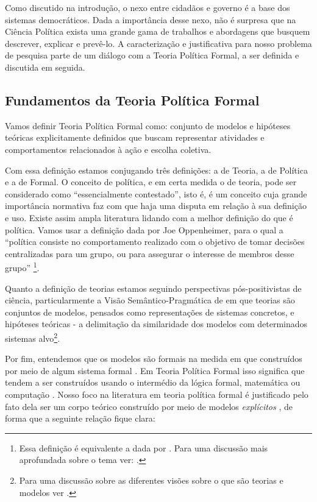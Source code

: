 Como discutido na introdução, o nexo entre cidadãos e governo é a base dos
sistemas democráticos. Dada a importância desse nexo, não é surpresa que na
Ciência Política exista uma grande gama de trabalhos e abordagens que busquem
descrever, explicar e prevê-lo. A caracterização e
justificativa para nosso problema de pesquisa parte de um diálogo com a Teoria
Política Formal, a ser definida e discutida em seguida.

\subsection{Fundamentos da Teoria Política Formal}

Vamos definir Teoria Política Formal como: conjunto de modelos e hipóteses
teóricas explicitamente definidos que buscam representar atividades e
comportamentos relacionados à ação e escolha coletiva.

Com essa definição estamos conjugando três definições: a de Teoria, a de
Política e a de Formal. O conceito de política, e em certa medida o de teoria,
pode ser considerado como ``essencialmente contestado'', isto é, é um conceito
cuja grande importância normativa faz com que haja uma disputa em relação à sua
definição e uso\cite{collier2006essentially}. Existe assim ampla literatura
lidando com a melhor definição do que é política. Vamos usar a definição
dada por Joe Oppenheimer, para o qual  a ``política consiste
no comportamento realizado com o objetivo de tomar decisões centralizadas para
um grupo, ou para assegurar o interesse de membros desse grupo'' \cite[p.
I]{oppenheimer2012principles}\footnote{Essa definição é equivalente a dada por
  . Para uma discussão mais aprofundada sobre o
  tema ver: .}.

Quanto a definição de teorias estamos seguindo perspectivas pós-positivistas de
ciência, particularmente a Visão Semântico-Pragmática de
 em que teorias são conjuntos de modelos, pensados
como representações de sistemas concretos, e hipóteses teóricas - a delimitação
da similaridade dos modelos com determinados sistemas alvo\footnote{Para uma
  discussão sobre as diferentes visões sobre o que são teorias e modelos ver
  .}.

Por fim, entendemos que os modelos são formais na medida em que construídos por
meio de algum sistema formal \cite{wong2015formal}. Em Teoria Política Formal
isso significa que tendem a ser construídos usando o intermédio da lógica formal,
matemática ou computação \cite{morton1999methods}. Nosso foco na literatura em
teoria política formal é justificado pelo fato dela ser um corpo teórico
construído por meio de modelos \textit{explícitos} \cite{epstein2008model}, de
forma que a seguinte relação fique clara:

